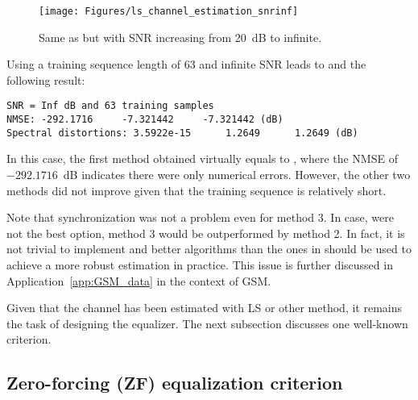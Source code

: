 
\begin{figure}
\centering
\texttt{[image: Figures/ls\_channel\_estimation\_snrinf]}
\caption{Same as  but with SNR increasing from 20~dB to infinite.\label{fig:ls_channel_estimation_snrinf}}
\end{figure}

Using a training sequence length of 63 and infinite SNR leads to  and the following result:
\begin{verbatim}
SNR = Inf dB and 63 training samples
NMSE: -292.1716     -7.321442     -7.321442 (dB)
Spectral distortions: 3.5922e-15      1.2649      1.2649 (dB)
\end{verbatim}
In this case, the first method obtained  virtually equals to , where
the NMSE of $-292.1716$~dB indicates there were only numerical errors.
However, the other two methods did not improve given that the training sequence is relatively short.


Note that synchronization was not a problem even for method 3. In case,  were not the best option, method 3 would be outperformed by method 2.
In fact, it is not trivial to implement  and better algorithms than the ones in  should be used to achieve a more robust estimation in practice.
This issue is further discussed in Application~\ref{app:GSM_data} in the context of GSM.
\eExample

Given that the channel has been estimated with LS or other method, it remains the task of designing the equalizer.
The next subsection discusses one well-known criterion.

\subsection{Zero-forcing (ZF) equalization criterion}

